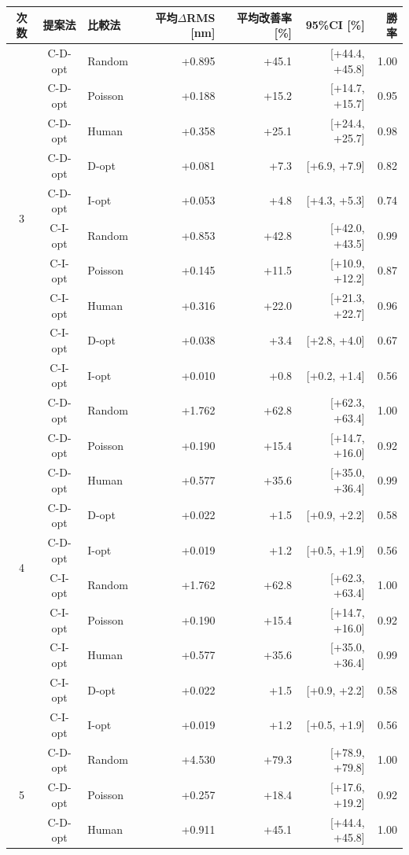 \begin{tabular}{cclrrrr}
\toprule
次数 & 提案法 & 比較法 & 平均$\Delta$RMS [nm] & 平均改善率 [\%] & 95\%CI [\%] & 勝率 \\
\midrule
\multirow{10}{*}{3} & C-D-opt & Random & +0.895 & +45.1 & [+44.4, +45.8] & 1.00 \\
 & C-D-opt & Poisson & +0.188 & +15.2 & [+14.7, +15.7] & 0.95 \\
 & C-D-opt & Human & +0.358 & +25.1 & [+24.4, +25.7] & 0.98 \\
 & C-D-opt & D-opt & +0.081 & +7.3 & [+6.9, +7.9] & 0.82 \\
 & C-D-opt & I-opt & +0.053 & +4.8 & [+4.3, +5.3] & 0.74 \\
 & C-I-opt & Random & +0.853 & +42.8 & [+42.0, +43.5] & 0.99 \\
 & C-I-opt & Poisson & +0.145 & +11.5 & [+10.9, +12.2] & 0.87 \\
 & C-I-opt & Human & +0.316 & +22.0 & [+21.3, +22.7] & 0.96 \\
 & C-I-opt & D-opt & +0.038 & +3.4 & [+2.8, +4.0] & 0.67 \\
 & C-I-opt & I-opt & +0.010 & +0.8 & [+0.2, +1.4] & 0.56 \\
\midrule
\multirow{10}{*}{4} & C-D-opt & Random & +1.762 & +62.8 & [+62.3, +63.4] & 1.00 \\
 & C-D-opt & Poisson & +0.190 & +15.4 & [+14.7, +16.0] & 0.92 \\
 & C-D-opt & Human & +0.577 & +35.6 & [+35.0, +36.4] & 0.99 \\
 & C-D-opt & D-opt & +0.022 & +1.5 & [+0.9, +2.2] & 0.58 \\
 & C-D-opt & I-opt & +0.019 & +1.2 & [+0.5, +1.9] & 0.56 \\
 & C-I-opt & Random & +1.762 & +62.8 & [+62.3, +63.4] & 1.00 \\
 & C-I-opt & Poisson & +0.190 & +15.4 & [+14.7, +16.0] & 0.92 \\
 & C-I-opt & Human & +0.577 & +35.6 & [+35.0, +36.4] & 0.99 \\
 & C-I-opt & D-opt & +0.022 & +1.5 & [+0.9, +2.2] & 0.58 \\
 & C-I-opt & I-opt & +0.019 & +1.2 & [+0.5, +1.9] & 0.56 \\
\midrule
\multirow{10}{*}{5} & C-D-opt & Random & +4.530 & +79.3 & [+78.9, +79.8] & 1.00 \\
 & C-D-opt & Poisson & +0.257 & +18.4 & [+17.6, +19.2] & 0.92 \\
 & C-D-opt & Human & +0.911 & +45.1 & [+44.4, +45.8] & 1.00 \\

\end{tabular}

